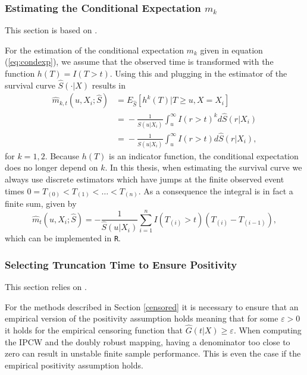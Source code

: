 \documentclass[12pt, a4paper]{scrartcl}
\theoremstyle{definition}
\theoremstyle{plain}
\numberwithin{equation}{section}
\numberwithin{figure}{section}
\numberwithin{table}{section}
\begin{document}
	\subsubsection{Estimating the Conditional Expectation $m_k$}
	
	This section is based on \citet*{drtrees}.
	
	For the estimation of the conditional expectation $m_k$ given in equation (\ref{eq:condexp}), we assume that the observed time is transformed with the function $h(T) = I(T>t)$.
	Using this and plugging in the estimator of the survival curve $\hat{S}(\cdot\vert X)$ results in
	\begin{equation*}
	\begin{split}
	\hat{m}_{k,t} (u, X_i; \hat{S}) &={} E_{\hat{S}}[h^k(T)\vert T \geq u, X=X_i]\\
	&={}-\frac{1}{\hat{S}(u\vert X_i)}\int_u^{\infty}I(r> t)^kd\hat{S}(r\vert X_i)\\
	&={}-\frac{1}{\hat{S}(u\vert X_i)}\int_u^{\infty}I(r> t)d\hat{S}(r\vert X_i),
	\end{split}
	\end{equation*}
	for $k=1,2$.
	Because $h(T)$ is an indicator function, the conditional expectation does no longer depend on $k$.
	In this thesis, when estimating the survival curve we always use discrete estimators which have jumps at the finite observed event times $0=T_{(0)}<T_{(1)}<\dots<T_{(n)}$.
	As a consequence the integral is in fact a finite sum, given by
	\begin{equation*}
	\hat{m}_t (u, X_i; \hat{S}) = -\frac{1}{\hat{S}(u\vert X_i)}\sum_{i=1}^n I(T_{(i)}>t)(T_{(i)}-T_{(i-1)}),
	\end{equation*}
	which can be implemented in \texttt{R}.
	
	\subsubsection{Selecting Truncation Time to Ensure Positivity}
	
	This section relies on \citet*{drtrees}.
	
	For the methods described in Section \ref{censored} it is necessary to ensure that an empirical version of the positivity assumption holds meaning that for some $\varepsilon>0$ it holds for the empirical censoring function that $\hat{G}(t\vert X) \geq \varepsilon$.
	When computing the IPCW and the doubly robust mapping, having a denominator too close to zero can result in unstable finite sample performance.
	This is even the case if the empirical positivity assumption holds.
	
\end{document}
